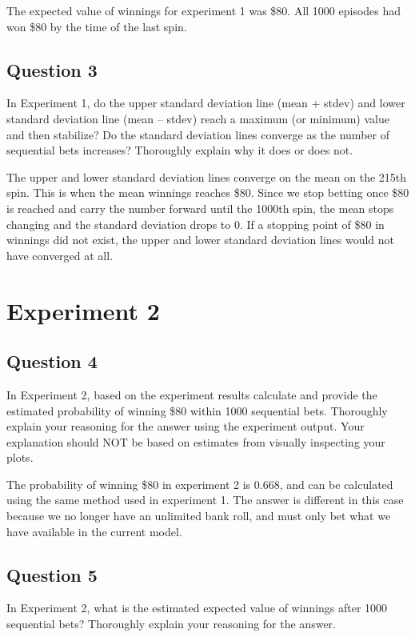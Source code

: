 \documentclass[
	letterpaper, %
]{jdf}
\begin{document}
The expected value of winnings for experiment 1 was \$80.  All 1000 episodes had won \$80 by the time of the last spin.


\subsection{Question 3}
 In Experiment 1, do the upper standard deviation line (mean + stdev) and lower standard deviation line (mean – stdev) reach a maximum (or minimum) value and then stabilize? Do the standard deviation lines converge as the number of sequential bets increases? Thoroughly explain why it does or does not. 
 
 The upper and lower standard deviation lines converge on the mean on the 215th spin. This is when the mean winnings reaches \$80.  Since we stop betting once \$80 is reached and carry the number forward until the 1000th spin, the mean stops changing and the standard deviation drops to 0.  If a stopping point of \$80 in winnings did not exist, the upper and lower standard deviation lines would not have converged at all.


\section{Experiment 2}



\subsection{Question 4}
In Experiment 2, based on the experiment results calculate and provide the estimated probability of winning \$80 within 1000 sequential bets. Thoroughly explain your reasoning for the answer using the experiment output. Your explanation should NOT be based on estimates from visually inspecting your plots. 

The probability of winning \$80 in experiment 2 is 0.668, and can be calculated using the same method used in experiment 1. The answer is different in this case because we no longer have an unlimited bank roll, and must only bet what we have available in the current model.

\subsection{Question 5}
In Experiment 2, what is the estimated expected value of winnings after 1000 sequential bets? Thoroughly explain your reasoning for the answer. 
\end{document}
